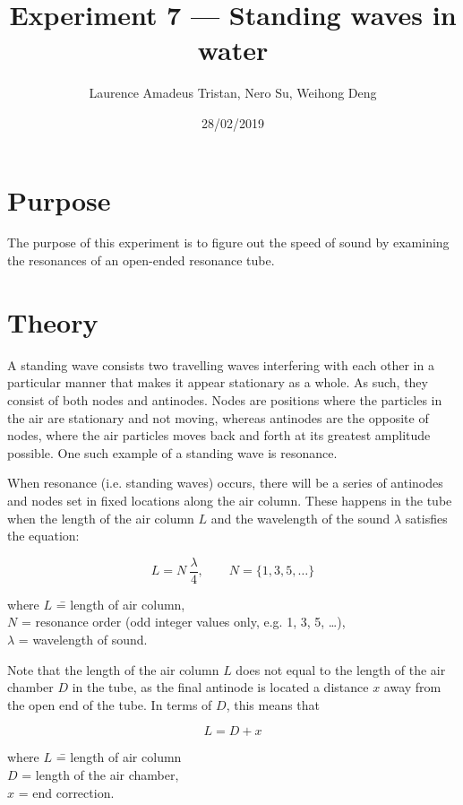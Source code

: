 \documentclass{article}
\title{Experiment 7 — Standing waves in water}
\author{Laurence Amadeus Tristan, Nero Su, Weihong Deng}
\date{28/02/2019}
\numberwithin{equation}{section}
\begin{document}
\maketitle
\section{Purpose}
The purpose of this experiment is to figure out the speed of sound by examining the resonances of an open-ended resonance tube.

\section{Theory}
A standing wave consists two travelling waves interfering with each other in a particular manner that makes it appear stationary as a whole. As such, they consist of both nodes and antinodes. Nodes are positions where the particles in the air are stationary and not moving, whereas antinodes are the opposite of nodes, where the air particles moves back and forth at its greatest amplitude possible. One such example of a standing wave is resonance.

When resonance (i.e. standing waves) occurs, there will be a series of antinodes and nodes set in fixed locations along the air column.  These happens in the tube when the length of the air column \(L\) and the wavelength of the sound \(\lambda\) satisfies the equation:

\begin{equation} \label{eq:l1}
  L = N \ \frac{\lambda}{4}, \qquad N = \{1, 3, 5, \ldots\}
\end{equation}

\begin{tabbing}
  where \= \(L\) \= = length of air column, \\
  \> \(N\) \> = resonance order (odd integer values only, e.g. 1, 3, 5, \ldots), \\
  \> \(\lambda\) \> = wavelength of sound.
\end{tabbing}

Note that the length of the air column \(L\) does not equal to the length of the air chamber \(D\) in the tube, as the final antinode is located a distance \(x\) away from the open end of the tube. In terms of \(D\), this means that

\begin{equation} \label{eq:l2}
  L = D + x
\end{equation}

\begin{tabbing}
  where \= \(L\) \= = length of air column \\
  \> \(D\) \> = length of the air chamber, \\
  \> \(x\) \> = end correction.
\end{tabbing}
\end{document}

